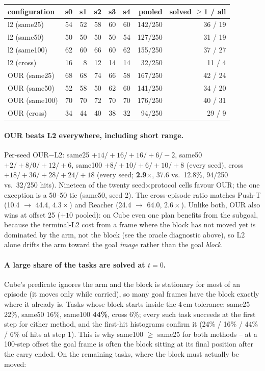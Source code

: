 \documentclass[11pt]{article}
\begin{document}
\begin{center}\small
\begin{tabular}{lrrrrrrr}
\toprule
configuration & s0 & s1 & s2 & s3 & s4 & pooled & solved $\ge$1 / all \\
\midrule
l2 (same25) & 54 & 52 & 58 & 60 & 60 & 142/250 & 36 / 19 \\
l2 (same50) & 50 & 50 & 50 & 50 & 54 & 127/250 & 31 / 19 \\
l2 (same100) & 62 & 60 & 66 & 60 & 62 & 155/250 & 37 / 27 \\
l2 (cross) & 16 & 8 & 12 & 14 & 14 & 32/250 & 11 / 4 \\
\midrule
OUR (same25) & 68 & 68 & 74 & 66 & 58 & 167/250 & 42 / 24 \\
OUR (same50) & 52 & 58 & 50 & 62 & 60 & 141/250 & 34 / 20 \\
OUR (same100) & 70 & 70 & 72 & 70 & 70 & 176/250 & 40 / 31 \\
OUR (cross) & 34 & 44 & 40 & 38 & 32 & 94/250 & 29 / 9 \\
\bottomrule
\end{tabular}
\end{center}

\paragraph{OUR beats L2 everywhere, including short range.} Per-seed OUR$-$L2: same25
$+14/{+}16/{+}16/{+}6/{-}2$, same50 $+2/{+}8/0/{+}12/{+}6$, same100 $+8/{+}10/{+}6/{+}10/{+}8$
(every seed), cross $+18/{+}36/{+}28/{+}24/{+}18$ (every seed; \textbf{2.9$\times$}, 37.6 vs.\
12.8\%, 94/250 vs.\ 32/250 hits). Nineteen of the twenty seed$\times$protocol cells favour OUR;
the one exception is a 50--50 tie (same50, seed 2). The cross-episode ratio matches Push-T
(10.4 $\to$ 44.4, $4.3\times$) and Reacher (24.4 $\to$ 64.0, $2.6\times$). Unlike both, OUR also
wins at offset 25 ($+10$ pooled): on Cube even one plan benefits from the subgoal, because the
terminal-L2 cost from a frame where the block has not moved yet is dominated by the arm, not
the block (see the oracle diagnostic above), so L2 alone drifts the arm toward the goal
\emph{image} rather than the goal \emph{block}.

\paragraph{A large share of the tasks are solved at $t=0$.} Cube's predicate ignores the arm
and the block is stationary for most of an episode (it moves only while carried), so many
goal frames have the block exactly where it already is. Tasks whose block starts inside the
4\,cm tolerance: same25 22\%, same50 16\%, same100 \textbf{44\%}, cross 6\%; every such task
succeeds at the first step for either method, and the first-hit histograms confirm it (24\% /
16\% / 44\% / 6\% of hits at step 1). This is why same100 $\ge$ same25 for both methods -- at
a 100-step offset the goal frame is often the block sitting at its final position after the
carry ended. On the remaining tasks, where the block must actually be moved:
\end{document}
